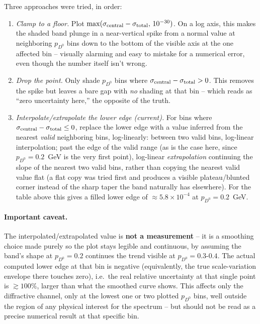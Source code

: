 \documentclass[11pt]{article}
\begin{document}
Three approaches were tried, in order:

\begin{enumerate}
\item \emph{Clamp to a floor.} Plot
$\max(\sigma_{\rm central}-\sigma_{\rm total},\,10^{-30})$. On a log axis,
this makes the shaded band plunge in a near-vertical spike from a normal
value at neighboring $p_{D^0}$ bins down to the bottom of the visible axis
at the one affected bin -- visually alarming and easy to mistake for a
numerical error, even though the number itself isn't wrong.
\item \emph{Drop the point.} Only shade $p_{D^0}$ bins where
$\sigma_{\rm central}-\sigma_{\rm total}>0$. This removes the spike but
leaves a bare gap with \emph{no} shading at that bin -- which reads as
``zero uncertainty here,'' the opposite of the truth.
\item \emph{Interpolate/extrapolate the lower edge (current).} For bins
where $\sigma_{\rm central}-\sigma_{\rm total}\le0$, replace the lower
edge with a value inferred from the nearest \emph{valid} neighboring bins,
log-linearly: between two valid bins, log-linear interpolation; past the
edge of the valid range (as is the case here, since $p_{D^0}=0.2$~GeV is
the very first point), log-linear \emph{extrapolation} continuing the
slope of the nearest two valid bins, rather than copying the nearest
valid value flat (a flat copy was tried first and produces a visible
plateau/blunted corner instead of the sharp taper the band naturally has
elsewhere). For the table above this gives a filled lower edge of
$\approx\!5.8\times10^{-4}$ at $p_{D^0}=0.2$~GeV.
\end{enumerate}

\paragraph{Important caveat.} The interpolated/extrapolated value is
\textbf{not a measurement} -- it is a smoothing choice made purely so the
plot stays legible and continuous, by assuming the band's shape at
$p_{D^0}=0.2$ continues the trend visible at $p_{D^0}=0.3$-$0.4$. The
actual computed lower edge at that bin is negative (equivalently, the true
scale-variation envelope there touches zero), i.e.\ the real relative
uncertainty at that single point is $\gtrsim100\%$, larger than what the
smoothed curve shows. This affects only the diffractive channel, only at
the lowest one or two plotted $p_{D^0}$ bins, well outside the region of
any physical interest for the spectrum -- but should not be read as a
precise numerical result at that specific bin.
\end{document}
